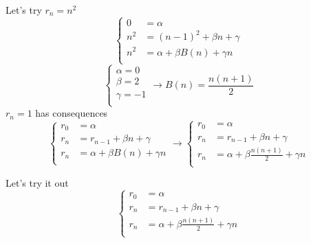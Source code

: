 Let's try $ r_n = n^2 $ 
\begin{equation*}
    \left\{
        \begin{array}{ll}
            0 &= \alpha \\
            n^2 &= (n-1)^2+\beta n+\gamma \\
            n^2 &= \alpha + \beta B(n) + \gamma n \\
        \end{array}
    \right.
\end{equation*}
\begin{equation*}
    \left\{
        \begin{array}{l}
            \alpha = 0\\
            \beta = 2\\
            \gamma = -1\\
        \end{array}
    \right.
    \rightarrow B(n) = \frac{n(n+1)}{2}
\end{equation*}
$ r_n=1 $ has consequences
\begin{equation*}
    \left\{
        \begin{array}{ll}
            r_0 &= \alpha\\
            r_n &= r_{n-1}+\beta n+\gamma\\
            r_n &= \alpha + \beta B(n) + \gamma n\\
        \end{array}
    \right.
    \rightarrow
    \left\{
        \begin{array}{ll}
            r_0 &= \alpha\\
            r_n &= r_{n-1}+\beta n+\gamma\\
            r_n &= \alpha + \beta \frac{n(n+1)}{2} + \gamma n\\
        \end{array}
    \right.
\end{equation*}

Let's try it out
\begin{equation*}
    \left\{
        \begin{array}{ll}
            r_0 &= \alpha\\
            r_n &= r_{n-1}+\beta n+\gamma\\
            r_n &= \alpha + \beta \frac{n(n+1)}{2} + \gamma n\\
        \end{array}
    \right.
\end{equation*}

